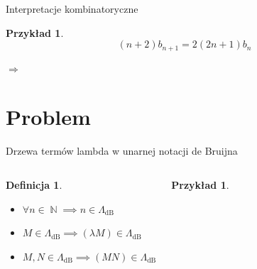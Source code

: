 \documentclass[final]{beamer}
\theoremstyle{bluetheorem}
\theoremstyle{bluetheorem}
\newtheorem{mydefinition}[mytheorem]{Definicja}
\theoremstyle{greentheorem}
\newtheorem{myexample}[mytheorem]{Przykład}
\newcommand{\LambdadB}{\ensuremath{\Lambda_{\text{dB}}}}
\DeclareMathOperator{\N}{\mathbb{N}}
\newcommand{\includeinlinescaledsvg}[3]{\begin{minipage}{#1\textwidth}\begin{center}\end{center}\end{minipage}}
\begin{document}
\begin{frame}{Interpretacje kombinatoryczne}
    \begin{myexample}
        \[(n + 2)b_{n + 1} = 2 (2n + 1)b_n\]

        \begin{center}
            \small
            \begin{minipage}{.20\textwidth}\end{minipage}%
            \(\Rightarrow\)
            \begin{minipage}{.3\textwidth}\end{minipage}%
            \begin{minipage}{.3\textwidth}\end{minipage}%
        \end{center}
    \end{myexample}
\end{frame}

\section{Problem}

\begin{frame}{Drzewa termów lambda w unarnej notacji de Bruijna}
    \begin{columns}
        \begin{mydefinition}
            \begin{itemize}
                \item \(\forall n \in \N \implies n \in \LambdadB\)
                \item \(M \in \LambdadB \implies (\lambda M) \in \LambdadB\)
                \item \(M, N \in \LambdadB \implies (M N) \in \LambdadB\)
            \end{itemize}
        \end{mydefinition}

        \begin{myexample}
            \begin{center}
                \includeinlinescaledsvg{1}{0.6}{lambda__tree_structure__deBruijn_002_custom}
            \end{center}
        \end{myexample}
    \end{columns}
\end{frame}
\end{document}
